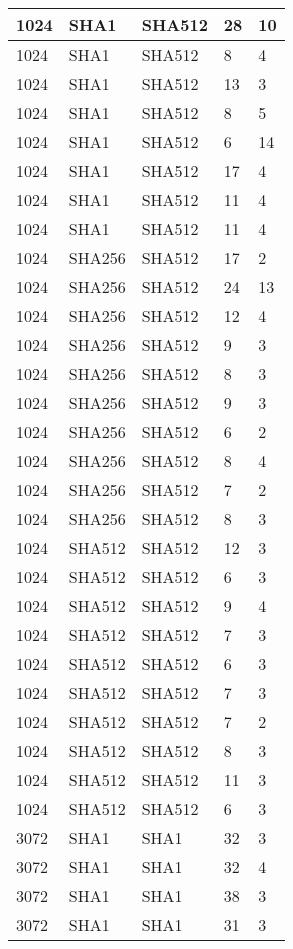 \begin{tabular}{| l | l | l | l | l |}
1024 & SHA1 & SHA512 & 28 & 10 \\ \hline 
1024 & SHA1 & SHA512 & 8 & 4 \\ \hline 
1024 & SHA1 & SHA512 & 13 & 3 \\ \hline 
1024 & SHA1 & SHA512 & 8 & 5 \\ \hline 
1024 & SHA1 & SHA512 & 6 & 14 \\ \hline 
1024 & SHA1 & SHA512 & 17 & 4 \\ \hline 
1024 & SHA1 & SHA512 & 11 & 4 \\ \hline 
1024 & SHA1 & SHA512 & 11 & 4 \\ \hline 
1024 & SHA256 & SHA512 & 17 & 2 \\ \hline 
1024 & SHA256 & SHA512 & 24 & 13 \\ \hline 
1024 & SHA256 & SHA512 & 12 & 4 \\ \hline 
1024 & SHA256 & SHA512 & 9 & 3 \\ \hline 
1024 & SHA256 & SHA512 & 8 & 3 \\ \hline 
1024 & SHA256 & SHA512 & 9 & 3 \\ \hline 
1024 & SHA256 & SHA512 & 6 & 2 \\ \hline 
1024 & SHA256 & SHA512 & 8 & 4 \\ \hline 
1024 & SHA256 & SHA512 & 7 & 2 \\ \hline 
1024 & SHA256 & SHA512 & 8 & 3 \\ \hline 
1024 & SHA512 & SHA512 & 12 & 3 \\ \hline 
1024 & SHA512 & SHA512 & 6 & 3 \\ \hline 
1024 & SHA512 & SHA512 & 9 & 4 \\ \hline 
1024 & SHA512 & SHA512 & 7 & 3 \\ \hline 
1024 & SHA512 & SHA512 & 6 & 3 \\ \hline 
1024 & SHA512 & SHA512 & 7 & 3 \\ \hline 
1024 & SHA512 & SHA512 & 7 & 2 \\ \hline 
1024 & SHA512 & SHA512 & 8 & 3 \\ \hline 
1024 & SHA512 & SHA512 & 11 & 3 \\ \hline 
1024 & SHA512 & SHA512 & 6 & 3 \\ \hline 
3072 & SHA1 & SHA1 & 32 & 3 \\ \hline 
3072 & SHA1 & SHA1 & 32 & 4 \\ \hline 
3072 & SHA1 & SHA1 & 38 & 3 \\ \hline 
3072 & SHA1 & SHA1 & 31 & 3 \\ \hline 

\end{tabular}
